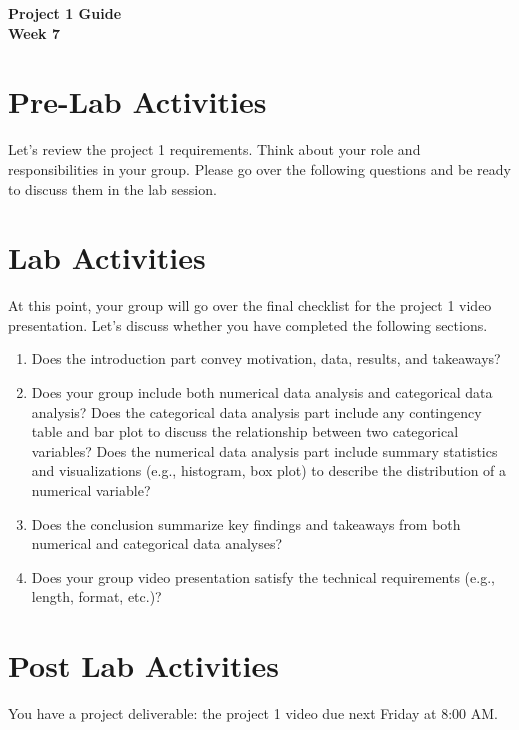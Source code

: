 \documentclass[12pt]{article}
\begin{document}
\begin{center}
\textbf{\Large Project 1 Guide \\ Week 7 } 
\end{center}

\section*{Pre-Lab Activities}
Let's review the project 1 requirements. 
Think about your role and responsibilities in your group.
Please go over the following questions and be ready to discuss them in the lab session.

\section*{Lab Activities}

At this point, your group will go over the final checklist for the project 1 video presentation. Let's discuss whether you have completed the following sections.

\begin{enumerate}
  \item Does the introduction part convey motivation, data, results, and takeaways?
  
  \vspace{1\baselineskip}
  
  \item Does your group include both numerical data analysis and categorical data analysis?  
  Does the categorical data analysis part include any contingency table and bar plot to discuss the relationship between two categorical variables?  
  Does the numerical data analysis part include summary statistics and visualizations (e.g., histogram, box plot) to describe the distribution of a numerical variable?
  
  \vspace{1\baselineskip}
  
  \item Does the conclusion summarize key findings and takeaways from both numerical and categorical data analyses?
  
  \vspace{1\baselineskip}
  
  \item Does your group video presentation satisfy the technical requirements (e.g., length, format, etc.)?
\end{enumerate}

\section*{Post Lab Activities}

You have a project deliverable: the project 1 video due next Friday at 8:00 AM.
\end{document}
